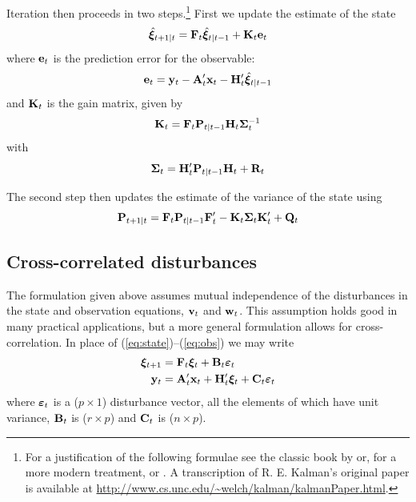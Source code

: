 Iteration then proceeds in two steps.\footnote{For a justification of
  the following formulae see the classic book by
  \cite{anderson-moore79} or, for a more modern treatment,
  \cite{pollock99} or \cite{hamilton94}.  A transcription of
  R. E. Kalman's original paper \citep{kalman60} is available at
  \url{http://www.cs.unc.edu/~welch/kalman/kalmanPaper.html}.}  First
we update the estimate of the state
%
\begin{equation}
\hat{\bm{\xi}}_{t+1|t} = \mathbf{F}_t\hat{\bm{\xi}}_{t|t-1} + 
  \mathbf{K}_t \mathbf{e}_t
\end{equation}
%
where $\mathbf{e}_t$ is the prediction error for the observable:
\[
\mathbf{e}_t = \mathbf{y}_t - \mathbf{A}_t'\mathbf{x}_t - \mathbf{H}_t' \hat{\bm{\xi}}_{t|t-1}
\]
%
and $\mathbf{K}_t$ is the gain matrix, given by
%
\begin{equation}
\label{eq:gain}
\mathbf{K}_t = \mathbf{F}_t\mathbf{P}_{t|t-1}\mathbf{H}_t \bm{\Sigma}_t^{-1}
\end{equation}
%
with
%
\[
\bm{\Sigma}_t = \mathbf{H}_t'\mathbf{P}_{t|t-1}\mathbf{H}_t + \mathbf{R}_t
\]

The second step then updates the estimate of the variance of the state
using
%
\begin{equation}
\mathbf{P}_{t+1|t} = \mathbf{F}_t\mathbf{P}_{t|t-1}\mathbf{F}_t' -
 \mathbf{K}_t \bm{\Sigma}_t \mathbf{K}_t' + \mathbf{Q}_t
\end{equation}

\subsection{Cross-correlated disturbances}

The formulation given above assumes mutual independence of the
disturbances in the state and observation equations, $\mathbf{v}_t$ and
$\mathbf{w}_t$.  This assumption holds good in many practical
applications, but a more general formulation allows for
cross-correlation.  In place of (\ref{eq:state})--(\ref{eq:obs}) we
may write
%
\begin{align*}
  \bm{\xi}_{t+1} &= \mathbf{F}_t \bm{\xi}_t + 
     \mathbf{B}_t \bm{\varepsilon}_t \\
  \mathbf{y}_t &= \mathbf{A}_t'\mathbf{x}_t + \mathbf{H}_t' \bm{\xi}_t + 
     \mathbf{C}_t \bm{\varepsilon}_t 
\end{align*}
%
where $\bm{\varepsilon}_t$ is a ($p \times 1$) disturbance vector, all the
elements of which have unit variance, $\mathbf{B}_t$ is ($r \times p$)
and $\mathbf{C}_t$ is ($n \times p$).


